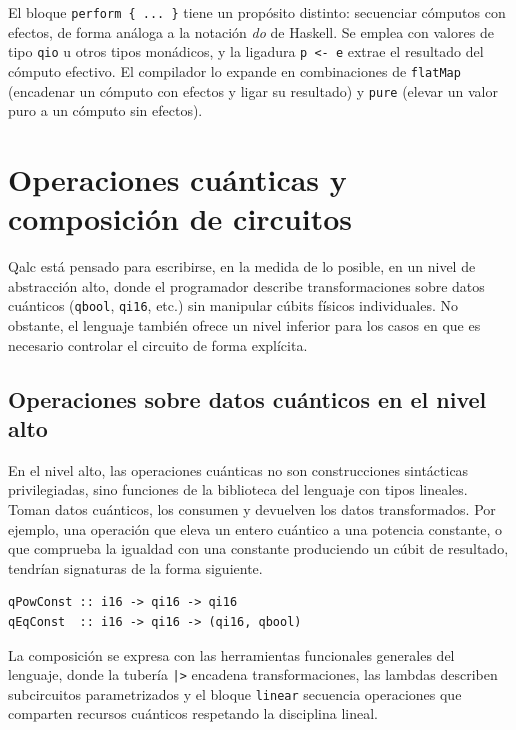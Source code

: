 El bloque \lstinline|perform { ... }| tiene un propósito distinto: secuenciar cómputos con efectos, de forma análoga a la notación \textit{do} de Haskell. Se emplea con valores de tipo \lstinline|qio| u otros tipos monádicos, y la ligadura \lstinline|p <- e| extrae el resultado del cómputo efectivo. El compilador lo expande en combinaciones de \lstinline|flatMap| (encadenar un cómputo con efectos y ligar su resultado) y \lstinline|pure| (elevar un valor puro a un cómputo sin efectos).

\section{Operaciones cuánticas y composición de circuitos}

Qalc está pensado para escribirse, en la medida de lo posible, en un nivel de abstracción alto, donde el programador describe transformaciones sobre datos cuánticos (\lstinline|qbool|, \lstinline|qi16|, etc.) sin manipular cúbits físicos individuales. No obstante, el lenguaje también ofrece un nivel inferior para los casos en que es necesario controlar el circuito de forma explícita.

\subsection{Operaciones sobre datos cuánticos en el nivel alto}

En el nivel alto, las operaciones cuánticas no son construcciones sintácticas privilegiadas, sino funciones de la biblioteca del lenguaje con tipos lineales. Toman datos cuánticos, los consumen y devuelven los datos transformados. Por ejemplo, una operación que eleva un entero cuántico a una potencia constante, o que comprueba la igualdad con una constante produciendo un cúbit de resultado, tendrían signaturas de la forma siguiente.

\begin{lstlisting}[language={}, caption=Operaciones cuánticas de alto nivel sobre qi16]
qPowConst :: i16 -> qi16 -> qi16
qEqConst  :: i16 -> qi16 -> (qi16, qbool)
\end{lstlisting}

La composición se expresa con las herramientas funcionales generales del lenguaje, donde la tubería \lstinline{|>} encadena transformaciones, las lambdas describen subcircuitos parametrizados y el bloque \lstinline|linear| secuencia operaciones que comparten recursos cuánticos respetando la disciplina lineal.

